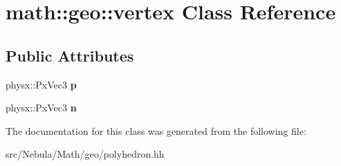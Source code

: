 \hypertarget{classmath_1_1geo_1_1vertex}{\section{math\-:\-:geo\-:\-:vertex Class Reference}
\label{classmath_1_1geo_1_1vertex}
}
\subsection*{Public Attributes}
\begin{DoxyCompactItemize}
\item 
\hypertarget{classmath_1_1geo_1_1vertex_ac68d02726094408a170228135a68a1ef}{physx\-::\-Px\-Vec3 {\bfseries p}}\label{classmath_1_1geo_1_1vertex_ac68d02726094408a170228135a68a1ef}

\item 
\hypertarget{classmath_1_1geo_1_1vertex_af0bd124b0e264a44aa5ee617e423c95d}{physx\-::\-Px\-Vec3 {\bfseries n}}\label{classmath_1_1geo_1_1vertex_af0bd124b0e264a44aa5ee617e423c95d}

\end{DoxyCompactItemize}


The documentation for this class was generated from the following file\-:\begin{DoxyCompactItemize}
\item 
src/\-Nebula/\-Math/geo/polyhedron.\-hh\end{DoxyCompactItemize}

